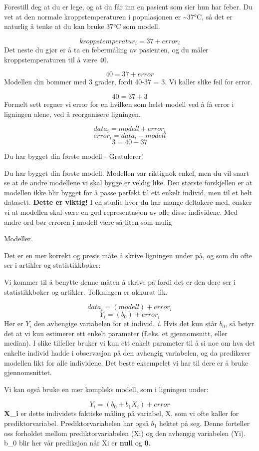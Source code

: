 \documentclass[
]{book}
\begin{document}
Forestill deg at du er lege, og at du får inn en pasient som sier hun har feber. Du vet at den normale kroppstemperaturen i populasjonen er \textasciitilde37°C, så det er naturlig å tenke at du kan bruke 37°C som modell.

\[
kroppstemperatur_i = 37 + error_i
\]
Det neste du gjør er å ta en febermåling av pasienten, og du måler kroppstemperaturen til å være 40.

\[
40 = 37 + error
\]
Modellen din bommer med 3 grader, fordi 40-37 = 3. Vi kaller slike feil for error.

\[
40 = 37 + 3
\]
Formelt sett regner vi error for en hvilken som helst modell ved å få error i ligningen alene, ved å reorganisere ligningen.

\[
data_i = modell + error_i
\]
\[
error_i = data_i - modell
\]
\[
3 = 40 - 37
\]

{Du har bygget din første modell - Gratulerer!}

Du har bygget din første modell. Modellen var riktignok enkel, men du vil snart se at de andre modellene vi skal bygge er veldig like. Den største forskjellen er at modellen ikke blir bygget for å passe perfekt til ett enkelt individ, men til et helt datasett. \textbf{Dette er viktig!} I en studie hvor du har mange deltakere med, ønsker vi at modellen skal være en god representasjon av alle disse individene. Med andre ord bør erroren i modell være så liten som mulig

{Modeller}.

Det er en mer korrekt og presis måte å skrive ligningen under på, og som du ofte ser i artikler og statistikkbøker:

Vi kommer til å benytte denne måten å skrive på fordi det er den dere ser i statistikkbøker og artikler. Tolkningen er akkurat lik.

\[
data_i = (modell) + error_i
\]
\[
Y_i = (b_0) + error_i
\]
Her er \(Y_i\) den avhengige variabelen for et individ, \emph{i}. Hvis det kun står \(b_0\), så betyr det at vi kun estimerer ett enkelt parameter (f.eks. et gjennomsnitt, eller median). I slike tilfeller bruker vi kun ett enkelt parameter til å si noe om hva det enkelte individ hadde i observasjon på den avhengig variabelen, og da predikerer modellen likt for alle individene. Det beste eksempelet vi har til dere er å bruke gjennomsnittet.

Vi kan også bruke en mer kompleks modell, som i ligningen under:

\[
Y_i = (b_0 + b_1X_i) + error
\]
\textbf{X\_i} er dette individets faktiske måling på variabel, X, som vi ofte kaller for prediktorvariabel. Prediktorvariabelen har også \(b_1\) hektet på seg. Denne forteller oss forholdet mellom prediktorvariabelen (Xi) og den avhengig variabelen (Yi). b\_0 blir her vår prediksjon når Xi er \textbf{null} og \textbf{0}.
\end{document}
